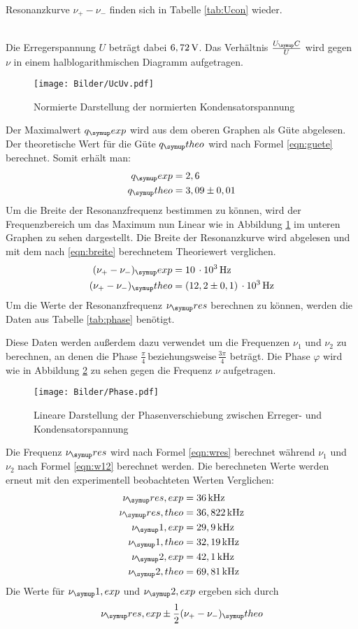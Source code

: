 Resonanzkurve $\nu_+ - \nu_-$ finden sich in Tabelle \ref{tab:Ucon} wieder.

\\
Die Erregerspannung $U$ beträgt dabei $6,72 \,\si{\volt}$.
Das Verhältnis $\frac{U_\su{C}}{U}$ wird gegen $\nu$ in einem halblogarithmischen
Diagramm aufgetragen.
\begin{figure}[h]
  \centering
  \texttt{[image: Bilder/UcUv.pdf]}
  \caption{Normierte Darstellung der normierten Kondensatorspannung}
  \label{fig:UcUv}
\end{figure}
Der Maximalwert $q_\su{exp}$ wird aus dem oberen Graphen als Güte abgelesen. Der
theoretische Wert für die Güte $q_\su{theo}$ wird nach Formel \eqref{eqn:guete} berechnet.
Somit erhält man:
\begin{align*}
  q_\su{exp} &= 2,6 \\
  q_\su{theo} &= 3,09 \pm 0,01
\end{align*}
Um die Breite der Resonanzfrequenz bestimmen zu können, wird der Frequenzbereich
um das Maximum nun Linear wie in Abbildung \ref{fig:UcUv} im unteren Graphen
zu sehen dargestellt. Die Breite der Resonanzkurve wird abgelesen und mit dem
nach \eqref{eqn:breite} berechnetem Theoriewert verglichen.
\begin{align*}
  (\nu_+ - \nu_-)_\su{exp} &= 10\,\cdot10^3\Hz \\
  (\nu_+ - \nu_-)_\su{theo}&= (12,2 \pm 0,1)\,\cdot 10^3\Hz %
\end{align*}
Um die Werte der Resonanzfrequenz $\nu_\su{res}$ berechnen zu können, werden
die Daten aus Tabelle \ref{tab:phase} benötigt.

Diese Daten werden außerdem dazu verwendet um die Frequenzen $\nu_1$ und
$\nu_2$ zu berechnen, an denen die Phase $\frac{\pi}{4}\,\text{beziehungsweise}\,
\frac{3\pi}{4}$ beträgt. Die Phase $\varphi$ wird wie in Abbildung \ref{fig:phse}
zu sehen gegen die Frequenz $\nu$ aufgetragen.
\begin{figure}[h]
  \centering
  \texttt{[image: Bilder/Phase.pdf]}
  \caption{Lineare Darstellung der Phasenverschiebung zwischen Erreger- und
  Kondensatorspannung}
  \label{fig:phse}
\end{figure}
Die Frequenz $\nu_\su{res}$ wird nach Formel \eqref{eqn:wres} berechnet
während $\nu_1$ und $\nu_2$ nach Formel \eqref{eqn:w12} berechnet werden.
Die berechneten Werte werden erneut mit den experimentell beobachteten Werten
Verglichen:
\begin{align*}
  \nu_\su{res,exp} &= 36\kHz \\
  \nu_\su{res,theo}&= 36,822 \kHz \\
  \nu_\su{1,exp} &= 29,9\kHz \\
  \nu_\su{1,theo}&=32,19\kHz \\
  \nu_\su{2,exp} &= 42,1 \kHz \\
  \nu_\su{2,theo}&= 69,81\kHz
\end{align*}
Die Werte für $\nu_\su{1,exp}$ und $\nu_\su{2,exp}$ ergeben sich durch
\begin{equation*}
  \nu_\su{res,exp} \pm \frac{1}{2}(\nu_+ - \nu_-)_\su{theo}
\end{equation*}
